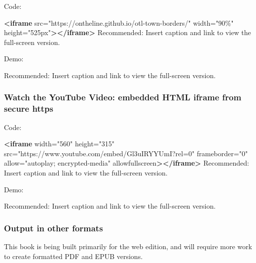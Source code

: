 \documentclass[
  english,
]{book}
\newenvironment{Shaded}{\begin{snugshade}}{\end{snugshade}}
\newcommand{\KeywordTok}[1]{\textcolor[rgb]{0.13,0.29,0.53}{\textbf{#1}}}
\newcommand{\NormalTok}[1]{#1}
\newcommand{\OtherTok}[1]{\textcolor[rgb]{0.56,0.35,0.01}{#1}}
\newcommand{\StringTok}[1]{\textcolor[rgb]{0.31,0.60,0.02}{#1}}
\begin{document}
Code:

\begin{Shaded}
\begin{Highlighting}[]
\KeywordTok{<iframe}\OtherTok{ src=}\StringTok{"https://ontheline.github.io/otl{-}town{-}borders/"}\OtherTok{ width=}\StringTok{"90\%"}\OtherTok{ height=}\StringTok{"525px"}\KeywordTok{></iframe>}
\NormalTok{Recommended: Insert caption and link to view the full{-}screen version.}
\end{Highlighting}
\end{Shaded}

Demo:

Recommended: Insert caption and link to view the full-screen version.

\hypertarget{watch-the-youtube-video-embedded-html-iframe-from-secure-https}{%
\subsubsection*{Watch the YouTube Video: embedded HTML iframe from secure https}\label{watch-the-youtube-video-embedded-html-iframe-from-secure-https}}

Code:

\begin{Shaded}
\begin{Highlighting}[]
\KeywordTok{<iframe}\OtherTok{ width=}\StringTok{"560"}\OtherTok{ height=}\StringTok{"315"}\OtherTok{ src=}\StringTok{"https://www.youtube.com/embed/Gl3uIRYYUmI?rel=0"}\OtherTok{ frameborder=}\StringTok{"0"}\OtherTok{ allow=}\StringTok{"autoplay; encrypted{-}media"}\OtherTok{ allowfullscreen}\KeywordTok{></iframe>}
\NormalTok{Recommended: Insert caption and link to view the full{-}screen version.}
\end{Highlighting}
\end{Shaded}

Demo:

Recommended: Insert caption and link to view the full-screen version.

\hypertarget{output-in-other-formats}{%
\subsubsection*{Output in other formats}\label{output-in-other-formats}}

This book is being built primarily for the web edition, and will require more work to create formatted PDF and EPUB versions.
\end{document}
